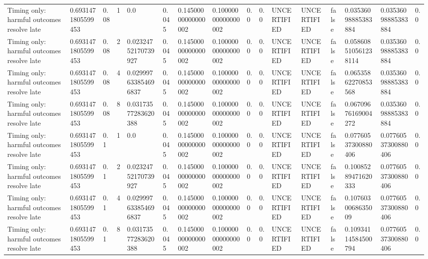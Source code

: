 \begin{tabular}{llllllllllllllll}
Timing only: harmful outcomes resolve late & 0.6931471805599453 & 0.08 & 1 & 0.0 & 0.045 & 0.14500000000000002 & 0.10000000000000002 & 0.0 & 0.0 & UNCERTIFIED & UNCERTIFIED & false & 0.03536098885383884 & 0.03536098885383884 & 0.0 \\
Timing only: harmful outcomes resolve late & 0.6931471805599453 & 0.08 & 2 & 0.02324752170739927 & 0.045 & 0.14500000000000002 & 0.10000000000000002 & 0.0 & 0.0 & UNCERTIFIED & UNCERTIFIED & false & 0.058608510561238114 & 0.03536098885383884 & 0.0 \\
Timing only: harmful outcomes resolve late & 0.6931471805599453 & 0.08 & 4 & 0.029997633854696837 & 0.045 & 0.14500000000000002 & 0.10000000000000002 & 0.0 & 0.0 & UNCERTIFIED & UNCERTIFIED & false & 0.06535862270853568 & 0.03536098885383884 & 0.0 \\
Timing only: harmful outcomes resolve late & 0.6931471805599453 & 0.08 & 8 & 0.03173577283620388 & 0.045 & 0.14500000000000002 & 0.10000000000000002 & 0.0 & 0.0 & UNCERTIFIED & UNCERTIFIED & false & 0.06709676169004272 & 0.03536098885383884 & 0.0 \\
Timing only: harmful outcomes resolve late & 0.6931471805599453 & 0.1 & 1 & 0.0 & 0.045 & 0.14500000000000002 & 0.10000000000000002 & 0.0 & 0.0 & UNCERTIFIED & UNCERTIFIED & false & 0.07760537300880406 & 0.07760537300880406 & 0.0 \\
Timing only: harmful outcomes resolve late & 0.6931471805599453 & 0.1 & 2 & 0.02324752170739927 & 0.045 & 0.14500000000000002 & 0.10000000000000002 & 0.0 & 0.0 & UNCERTIFIED & UNCERTIFIED & false & 0.10085289471620333 & 0.07760537300880406 & 0.0 \\
Timing only: harmful outcomes resolve late & 0.6931471805599453 & 0.1 & 4 & 0.029997633854696837 & 0.045 & 0.14500000000000002 & 0.10000000000000002 & 0.0 & 0.0 & UNCERTIFIED & UNCERTIFIED & false & 0.1076030068635009 & 0.07760537300880406 & 0.0 \\
Timing only: harmful outcomes resolve late & 0.6931471805599453 & 0.1 & 8 & 0.03173577283620388 & 0.045 & 0.14500000000000002 & 0.10000000000000002 & 0.0 & 0.0 & UNCERTIFIED & UNCERTIFIED & false & 0.10934114584500794 & 0.07760537300880406 & 0.0 \\
\bottomrule
\end{tabular}
